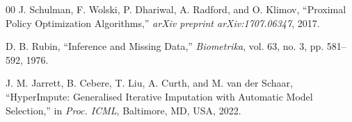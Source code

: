 \documentclass[conference]{IEEEtran}
\begin{document}
\begin{thebibliography}{00}
J. Schulman, F. Wolski, P. Dhariwal, A. Radford, and O. Klimov,
``Proximal Policy Optimization Algorithms,'' \textit{arXiv preprint
arXiv:1707.06347}, 2017.

D. B. Rubin, ``Inference and Missing Data,'' \textit{Biometrika},
vol. 63, no. 3, pp. 581--592, 1976.

J. M. Jarrett, B. Cebere, T. Liu, A. Curth, and M. van der Schaar,
``HyperImpute: Generalised Iterative Imputation with Automatic
Model Selection,'' in \textit{Proc. ICML}, Baltimore, MD, USA, 2022.

\end{thebibliography}
\end{document}
